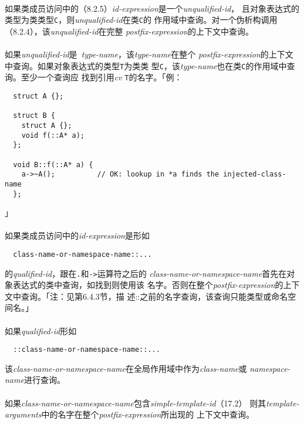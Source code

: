 \paragraph{}
如果类成员访问中的（8.2.5）\textit{id-expression}是一个\textit{unqualified-id}，
且对象表达式的类型为类类型\texttt{C}，则\textit{unqualified-id}在类\texttt{C}的
作用域中查询。对一个伪析构调用（8.2.4），该\textit{unqualified-id}在完整
\textit{postfix-expression}的上下文中查询。

\paragraph{}
如果\textit{unqualified-id}是\textit{~type-name}，该\textit{type-name}在整个
\textit{postfix-expression}的上下文中查询。如果对象表达式的类型\texttt{T}为类类
型\texttt{C}，该\textit{type-name}也在类\texttt{C}的作用域中查询。至少一个查询应
找到引用\textit{cv} \texttt{T}的名字。「例：
\begin{lstlisting}
  struct A {};

  struct B {
    struct A {};
    void f(::A* a);
  };

  void B::f(::A* a) {
    a->~A();          // OK: lookup in *a finds the injected-class-name
  };
\end{lstlisting}」

\paragraph{}
如果类成员访问中的\textit{id-expression}是形如
\begin{lstlisting}
  class-name-or-namespace-name::...
\end{lstlisting}
的\textit{qualified-id}，跟在\texttt{.}和\texttt{->}运算符之后的
\textit{class-name-or-namespace-name}首先在对象表达式的类中查询，如找到则使用该
名字。否则在整个\textit{postfix-expression}的上下文中查询。「注：见第6.4.3节，描
述::之前的名字查询，该查询只能类型或命名空间名。」

\paragraph{}
如果\textit{qualified-id}形如
\begin{lstlisting}
  ::class-name-or-namespace-name::...
\end{lstlisting}
该\textit{class-name-or-namespace-name}在全局作用域中作为\textit{class-name}或
\textit{namespace-name}进行查询。

\paragraph{}
如果\textit{class-name-or-namespace-name}包含\textit{simple-template-id}（17.2）
则其\textit{template-arguments}中的名字在整个\textit{postfix-expression}所出现的
上下文中查询。

